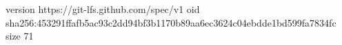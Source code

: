 version https://git-lfs.github.com/spec/v1
oid sha256:453291ffafb5ac93c2dd94bf3b1170b89aa6ec3624c04ebdde1bd599fa7834fc
size 71
